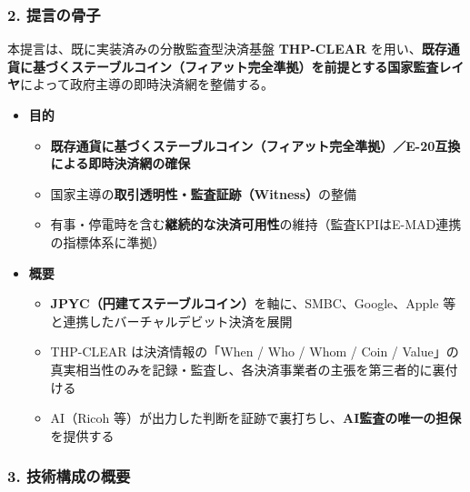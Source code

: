 \documentclass[
]{article}
\providecommand{\tightlist}{%
  \setlength{\itemsep}{0pt}\setlength{\parskip}{0pt}}
\begin{document}
\subsubsection{2. 提言の骨子}\label{ux63d0ux8a00ux306eux9aa8ux5b50}

本提言は、既に実装済みの分散監査型決済基盤 \textbf{THP-CLEAR}
を用い、\textbf{既存通貨に基づくステーブルコイン（フィアット完全準拠）を前提とする国家監査レイヤ}によって政府主導の即時決済網を整備する。

\begin{itemize}
\tightlist
\item
  \textbf{目的}

  \begin{itemize}
  \tightlist
  \item
    \textbf{既存通貨に基づくステーブルコイン（フィアット完全準拠）／E-20互換による即時決済網の確保}\\
  \item
    国家主導の\textbf{取引透明性・監査証跡（Witness）}の整備\\
  \item
    有事・停電時を含む\textbf{継続的な決済可用性}の維持（監査KPIはE-MAD連携の指標体系に準拠）
  \end{itemize}
\item
  \textbf{概要}

  \begin{itemize}
  \tightlist
  \item
    \textbf{JPYC（円建てステーブルコイン）}を軸に、SMBC、Google、Apple
    等と連携したバーチャルデビット決済を展開\\
  \item
    THP-CLEAR は決済情報の「When / Who / Whom / Coin /
    Value」の真実相当性のみを記録・監査し、各決済事業者の主張を第三者的に裏付ける\\
  \item
    AI（Ricoh
    等）が出力した判断を証跡で裏打ちし、\textbf{AI監査の唯一の担保}を提供する
  \end{itemize}
\end{itemize}

\subsubsection{3.
技術構成の概要}\label{ux6280ux8853ux69cbux6210ux306eux6982ux8981}
\end{document}
